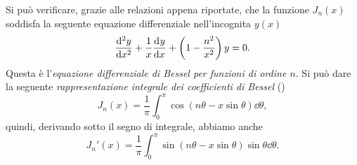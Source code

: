 Si può verificare, grazie alle relazioni appena riportate, che la funzione
$J_n(x)$ soddisfa la seguente equazione differenziale nell'incognita $y(x)$
\begin{equation}
  \toder[2]{y}{x} + \frac{1}{x}\toder{y}{x} +
  \left(
    1 - \frac{n^2}{x^2}
  \right)y = 0.
\end{equation}
Questa è l'\emph{equazione differenziale di Bessel per funzioni di ordine
  $n$}.
Si può dare la seguente \emph{rappresentazione integrale dei coefficienti di
  Bessel} (\textcites{watson:bessel}{whittaker:modern-analysis})
\begin{equation}
  \label{eq:bessel-integrale}
  J_n(x) = \frac{1}{\pi} \int_0^\pi\cos(n\theta - x\sin\theta)\dd\theta,
\end{equation}
quindi, derivando sotto il segno di integrale, abbiamo anche
\begin{equation}
  \label{eq:bessel-derivata-integrale}
  J_n'(x) = \frac{1}{\pi}\int_0^\pi\sin(n\theta - x\sin\theta)
  \sin\theta\dd\theta.
\end{equation}

